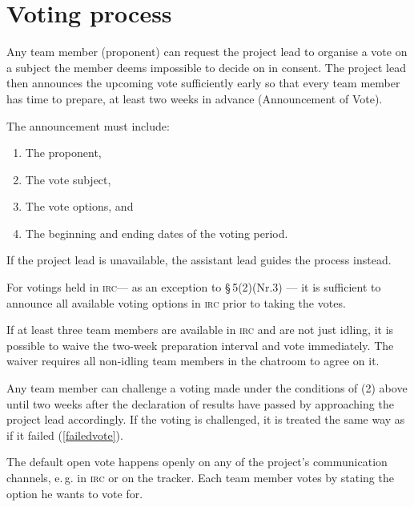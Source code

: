 \documentclass[10pt,a4paper,DIV=calc,headings=medium,twocolumn,final]{scrartcl}
\newcommand\irc{\textsc{irc}\xspace}
\newcommand\eg{e.\,g.\xspace}
\begin{document}
\section{Voting process}

\begin{contract}

  \label{cl:voting}

  Any team member (proponent) can request the project lead to organise
  a vote on a subject the member deems impossible to decide on in
  consent. The project lead then announces the upcoming vote
  sufficiently early so that every team member has time to prepare, at
  least two weeks in advance (Announcement of Vote).

  The announcement must include:

  \begin{enumerate}
  \item The proponent,
  \item The vote subject,
  \item The vote options, and
  \item The beginning and ending dates of the voting period.
  \end{enumerate}

  If the project lead is unavailable, the assistant lead guides the
  process instead.


  For votings held in \irc — as an exception to §\,5(2)(Nr.3) — it is
  sufficient to announce all available voting options in \irc prior to
  taking the votes.

  If at least three team members are available in \irc and are not just
  idling, it is possible to waive the two-week preparation interval
  and vote immediately. The waiver requires all non-idling team
  members in the chatroom to agree on it.


  Any team member can challenge a voting made under the conditions of
  (2) above until two weeks after the declaration of results have
  passed by approaching the project lead accordingly. If the voting is
  challenged, it is treated the same way as if it failed (\ref{failedvote}).


  The default open vote happens openly on any of the project’s
  communication channels, \eg in \irc or on the tracker. Each team
  member votes by stating the option he wants to vote for.


\end{contract}
\end{document}
